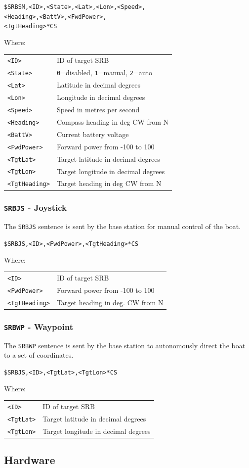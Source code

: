 \documentclass[a4paper]{IEEEtran}
\newenvironment{nmeaspec}[1]
{
\newcommand{\field}[2]{\texttt{##1} & ##2 \\}
\vspace{0.2cm}
\noindent\texttt{#1}
\vspace{0.2cm}

\noindent Where: \vspace{0.1cm}\\  \noindent
\vspace{0.2cm}
\begin{tabular}{ll}
}
{
\end{tabular}
}
\begin{document}
\begin{nmeaspec}{\$SRBSM,<ID>,<State>,<Lat>,<Lon>,<Speed>,\\<Heading>,<BattV>,<FwdPower>,\\<TgtHeading>*CS}
\field{<ID>}{ID of target SRB}
\field{<State>}{\texttt{0}=disabled, \texttt{1}=manual, \texttt{2}=auto}
\field{<Lat>}{Latitude in decimal degrees}
\field{<Lon>}{Longitude in decimal degrees}
\field{<Speed>}{Speed in metres per second}
\field{<Heading>}{Compass heading in deg CW from N}
\field{<BattV>}{Current battery voltage}
\field{<FwdPower>}{Forward power from -100 to 100}
\field{<TgtLat>}{Target latitude in decimal degrees}
\field{<TgtLon>}{Target longitude in decimal degrees}
\field{<TgtHeading>}{Target heading in deg CW from N}
\end{nmeaspec}

\subsubsection{\texttt{SRBJS} - Joystick}
The \texttt{SRBJS} sentence is sent by the base station for manual control of the boat.

\begin{nmeaspec}{\$SRBJS,<ID>,<FwdPower>,<TgtHeading>*CS}
\field{<ID>}{ID of target SRB}
\field{<FwdPower>}{Forward power from -100 to 100}
\field{<TgtHeading>}{Target heading in deg. CW from N}
\end{nmeaspec}

\subsubsection{\texttt{SRBWP} - Waypoint}
The \texttt{SRBWP} sentence is sent by the base station to autonomously direct the boat to a set of coordinates.

\begin{nmeaspec}{\$SRBJS,<ID>,<TgtLat>,<TgtLon>*CS}
\field{<ID>}{ID of target SRB}
\field{<TgtLat>}{Target latitude in decimal degrees}
\field{<TgtLon>}{Target longitude in decimal degrees}
\end{nmeaspec}

\subsection{Hardware}
\end{document}
